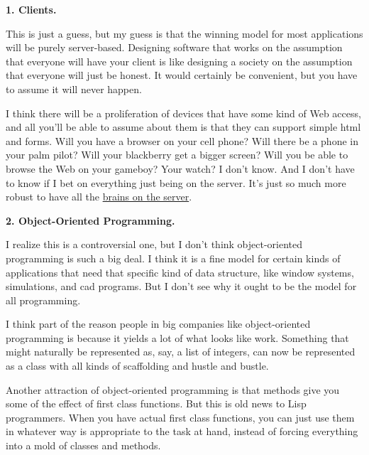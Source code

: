\textbf{1. Clients.}

This is just a
                    guess, but my guess is that the winning model for most
                    applications will be purely server-based. Designing software
                    that works on the assumption that everyone will have your
                    client is like designing a society on the assumption that
                    everyone will just be honest. It would certainly be
                    convenient, but you have to assume it will never happen.

I
                    think there will be a proliferation of devices that have
                    some kind of Web access, and all you'll be able to assume
                    about them is that they can support simple html and forms.
                    Will you have a browser on your cell phone? Will there be a
                    phone in your palm pilot? Will your blackberry get a bigger
                    screen? Will you be able to browse the Web on your gameboy?
                    Your watch? I don't know. And I don't have to know if I bet
                    on everything just being on the server. It's just so much
                    more robust to have all the
                    \href{http://www.paulgraham.com/road.html}{brains on the server}.

\textbf{2. Object-Oriented Programming.}

I realize this is a controversial one, but I
                    don't think object-oriented programming is such a big deal.
                    I think it is a fine model for certain kinds of applications
                    that need that specific kind of data structure, like window
                    systems, simulations, and cad programs. But I don't see why
                    it ought to be the model for all programming.

I
                    think part of the reason people in big companies like
                    object-oriented programming is because it yields a lot of
                    what looks like work. Something that might naturally be
                    represented as, say, a list of integers, can now be
                    represented as a class with all kinds of scaffolding and
                    hustle and bustle.

Another attraction of
                    object-oriented programming is that methods give you some of
                    the effect of first class functions. But this is old news to
                    Lisp programmers. When you have actual first class
                    functions, you can just use them in whatever way is
                    appropriate to the task at hand, instead of forcing
                    everything into a mold of classes and methods.

